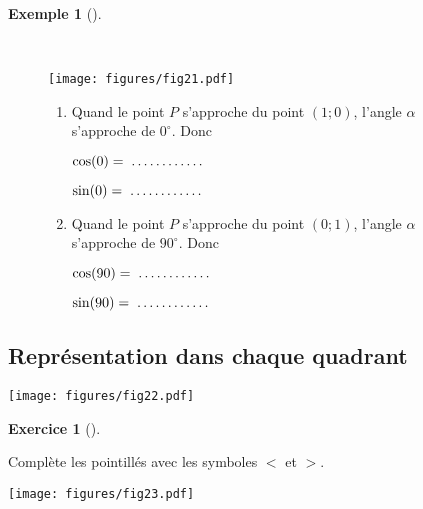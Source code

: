 \documentclass[
  a4paper,
  DIV=11,
  numbers=noendperiod,
  oneside]{scrreprt}
\theoremstyle{definition}
\theoremstyle{definition}
\newtheorem{exercise}{Exercice}[chapter]
\theoremstyle{plain}
\theoremstyle{definition}
\newtheorem{example}{Exemple}[chapter]
\theoremstyle{remark}
\begin{document}
\begin{example}[]\protect\hypertarget{exm-sincos}{}\label{exm-sincos}

~

\begin{figure}

\begin{minipage}{0.60\linewidth}
\begin{center}
\texttt{[image: figures/fig21.pdf]}
\end{center}
\end{minipage}%
%
\begin{minipage}{0.40\linewidth}

\begin{enumerate}
\def\labelenumi{\arabic{enumi})}
\item
  Quand le point \(P\) s'approche du point \((1;0)\), l'angle \(\alpha\)
  s'approche de \(0^\circ\). Donc

  \(\cos(0)=\makebox[2cm]{\dotfill}\)

  \(\sin(0)=\makebox[2cm]{\dotfill}\)
\item
  Quand le point \(P\) s'approche du point \((0;1)\), l'angle \(\alpha\)
  s'approche de \(90^\circ\). Donc

  \(\cos(90)=\makebox[2cm]{\dotfill}\)

  \(\sin(90)=\makebox[2cm]{\dotfill}\)
\end{enumerate}

\end{minipage}%

\end{figure}%

\end{example}

\subsection{Représentation dans chaque
quadrant}\label{repruxe9sentation-dans-chaque-quadrant}

\begin{center}
\texttt{[image: figures/fig22.pdf]}
\end{center}

\begin{exercise}[]\protect\hypertarget{exr-signe-sincos}{}\label{exr-signe-sincos}

Complète les pointillés avec les symboles \(<\) et \(>\). \begin{center}
\texttt{[image: figures/fig23.pdf]}
\end{center}

\end{exercise}
\end{document}
